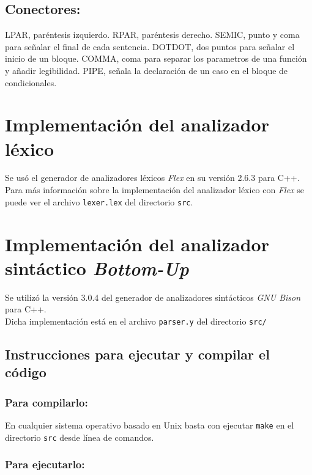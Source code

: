 \documentclass[12pt]{article}
\begin{document}
    \subsection{Conectores:}
    \begin{outline}
 	\2 LPAR, paréntesis izquierdo.
    \2 RPAR, paréntesis derecho.
    \2 SEMIC, punto y coma para señalar el final de cada sentencia.
    \2 DOTDOT, dos puntos para señalar el inicio de un bloque.
    \2 COMMA, coma para separar los parametros de una función y añadir legibilidad.
    \2 PIPE, señala la declaración de un caso en el bloque de condicionales.
\end{outline}


\section{Implementación del analizador léxico}
Se usó el generador de analizadores léxicos \textit{Flex} en su versión 2.6.3 para C++. \\
Para más información sobre la implementación del analizador léxico con \textit{Flex} se puede ver el archivo \texttt{lexer.lex} del directorio \texttt{src}.\\
\section{Implementación del analizador sintáctico \textit{Bottom-Up}}
Se utilizó la versión 3.0.4 del generador de analizadores sintácticos \textit{GNU Bison} para C++. \\
Dicha implementación está en el archivo \texttt{parser.y} del directorio \texttt{src/}



\subsection*{Instrucciones para ejecutar y compilar el código}

\subsubsection*{Para compilarlo:}

En cualquier sistema operativo basado en Unix basta con ejecutar \texttt{make} en el directorio \texttt{src} desde línea de comandos. 

\subsubsection*{Para ejecutarlo:} 
\end{document}
